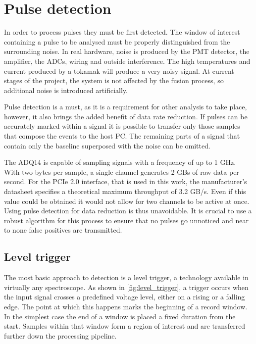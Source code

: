 \section{Pulse detection}
In order to process pulses they must be first detected. 
The window of interest containing a pulse to be analysed
must be properly distinguished from the surrounding noise.
In real hardware, noise is produced by the PMT detector, 
the amplifier, the ADCs, wiring and outside interference.
The high temperatures and current produced by a tokamak
will produce a very noisy signal. At current stages of the project,
the system is not affected by the fusion process, so
additional noise is introduced artificially.


Pulse detection is a must, as it is a requirement for 
other analysis to take place, however,
it also brings the added benefit
of data rate reduction. If pulses can be accurately 
marked within a signal it is possible to transfer only
those samples that compose the events to the host PC. 
The remaining parts of a signal that contain only the
baseline superposed with the noise can be omitted.


The ADQ14 is capable of sampling signals with a frequency of
up to 1 GHz. With two bytes per sample, a single channel 
generates 2 GBs of raw data per second. For the PCIe 2.0 interface,
that is used in this work, the manufacturer's 
datasheet specifies a theoretical maximum throughput of 3.2 GB/s.
Even if this value could be obtained it would not allow 
for two channels to be active at once.
Using pulse detection for data reduction is thus unavoidable.
It is crucial to use a robust algorithm for this process to ensure 
that no pulses go unnoticed and near to none
false positives are transmitted.

\subsection{Level trigger}

The most basic approach to detection is a level trigger,
a technology available in virtually any spectroscope. As shown in 
\autoref{fig:level_trigger}, a trigger occurs when
the input signal crosses a predefined voltage level,
either on a rising or a falling edge. The point at which
this happens marks the beginning of a record window.
In the simplest case the end of a window is placed
a fixed duration from the start. Samples within that window
form a region of interest and are transferred further
down the processing pipeline.

